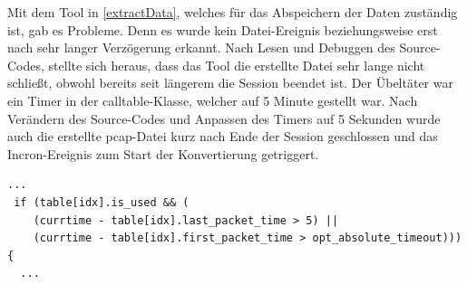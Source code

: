 Mit dem Tool in \ref{extractData}, welches für das Abspeichern der Daten zuständig ist, gab es Probleme. Denn es wurde kein Datei-Ereignis beziehungsweise erst nach sehr langer Verzögerung erkannt. Nach Lesen und Debuggen des Source-Codes, stellte sich heraus, dass das Tool die erstellte Datei sehr lange nicht schließt, obwohl bereits seit längerem die Session beendet ist. Der Übeltäter war ein Timer in der calltable-Klasse, welcher auf 5 Minute gestellt war. Nach Verändern des Source-Codes und Anpassen des Timers auf 5 Sekunden wurde auch die erstellte pcap-Datei kurz nach Ende der Session geschlossen und das Incron-Ereignis zum Start der Konvertierung getriggert.

\begin{lstlisting}[xleftmargin=.04\textwidth, firstnumber=211]
  ...
 if (table[idx].is_used && (
 	(currtime - table[idx].last_packet_time > 5) ||
    (currtime - table[idx].first_packet_time > opt_absolute_timeout))){
  ...
\end{lstlisting}
